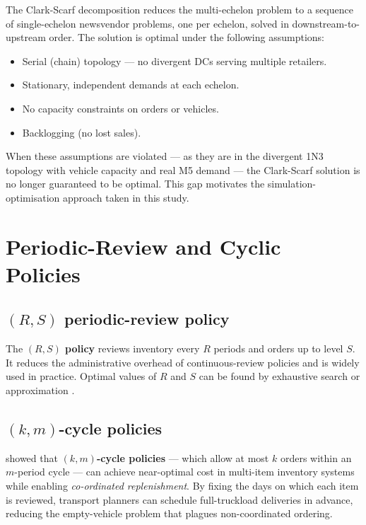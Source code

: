 The Clark-Scarf decomposition reduces the multi-echelon problem to a
sequence of single-echelon newsvendor problems, one per echelon, solved
in downstream-to-upstream order.  The solution is optimal under the
following assumptions:
\begin{itemize}
  \item Serial (chain) topology — no divergent DCs serving multiple retailers.
  \item Stationary, independent demands at each echelon.
  \item No capacity constraints on orders or vehicles.
  \item Backlogging (no lost sales).
\end{itemize}

When these assumptions are violated — as they are in the divergent 1N3
topology with vehicle capacity and real M5 demand — the Clark-Scarf
solution is no longer guaranteed to be optimal.  This gap motivates
the simulation-optimisation approach taken in this study.

\section{Periodic-Review and Cyclic Policies}
\label{sec:lit:periodic}
\vspace{1em}

\subsection{$(R,S)$ periodic-review policy}

The \textbf{$(R,S)$ policy} reviews inventory every $R$ periods and
orders up to level $S$.  It reduces the administrative overhead of
continuous-review policies and is widely used in practice.  Optimal
values of $R$ and $S$ can be found by exhaustive search or approximation
\citep{Silver1978}.

\subsection{$(k,m)$-cycle policies}

\citet{Roundy1985} showed that \textbf{$(k,m)$-cycle policies} — which
allow at most $k$ orders within an $m$-period cycle — can achieve
near-optimal cost in multi-item inventory systems while enabling
\emph{co-ordinated replenishment}.  By fixing the days on which each
item is reviewed, transport planners can schedule full-truckload
deliveries in advance, reducing the empty-vehicle problem that plagues
non-coordinated ordering.

